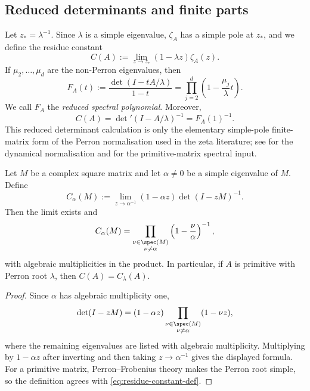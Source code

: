 \subsection{Reduced determinants and finite parts}

Let \(z_\ast=\lambda^{-1}\). Since \(\lambda\) is a simple eigenvalue,
\(\zeta_A\) has a simple pole at \(z_\ast\), and we define the residue
constant
\begin{equation}\label{eq:residue-constant-def}
  C(A):=\lim_{z\to z_\ast}(1-\lambda z)\zeta_A(z).
\end{equation}
If \(\mu_2,\dots,\mu_d\) are the non-Perron eigenvalues, then
\begin{equation}\label{eq:reduced-det-poly}
  F_A(t):=\frac{\det(I-tA/\lambda)}{1-t}
  =\prod_{j=2}^d\left(1-\frac{\mu_j}{\lambda}t\right).
\end{equation}
We call \(F_A\) the \emph{reduced spectral polynomial}. Moreover,
\begin{equation}\label{eq:reduced-det-constant}
  C(A)=\det\nolimits'(I-A/\lambda)^{-1}=F_A(1)^{-1}.
\end{equation}
This reduced determinant calculation is only the elementary simple-pole
finite-matrix form of the Perron normalisation used in the zeta literature;
see \cite{ParryPollicott1990Zeta} for the dynamical normalisation and
\cite{Seneta2006NonnegativeMatrices} for the primitive-matrix spectral input.

\begin{lemma}
  \label{lem:simple-eigenvalue-reduced-constant}
  Let \(M\) be a complex square matrix and let
  \(\alpha\neq 0\) be a simple eigenvalue of \(M\). Define
  \[
    C_\alpha(M)
    :=\lim_{z\to \alpha^{-1}}
      (1-\alpha z)\det(I-zM)^{-1}.
  \]
  Then the limit exists and
  \[
    C_\alpha(M)
    =
    \prod_{\substack{\nu\in\spec(M)\\ \nu\neq\alpha}}
      \left(1-\frac{\nu}{\alpha}\right)^{-1},
  \]
  with algebraic multiplicities in the product. In particular, if \(A\)
  is primitive with Perron root \(\lambda\), then
  \(C(A)=C_\lambda(A)\).
\end{lemma}

\begin{proof}
  Since \(\alpha\) has algebraic multiplicity one,
  \[
    \det(I-zM)
    =(1-\alpha z)
      \prod_{\substack{\nu\in\spec(M)\\ \nu\neq\alpha}}(1-\nu z),
  \]
  where the remaining eigenvalues are listed with algebraic
  multiplicity. Multiplying by \(1-\alpha z\) after inverting and then
  taking \(z\to \alpha^{-1}\) gives the displayed formula. For a
  primitive matrix, Perron--Frobenius theory
  \cite{Seneta2006NonnegativeMatrices} makes the Perron root simple, so the
  definition agrees with \eqref{eq:residue-constant-def}.
\end{proof}

